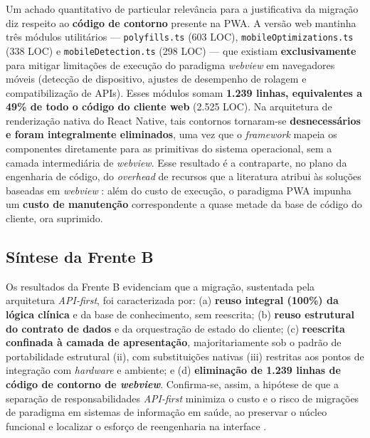 Um achado quantitativo de particular relevância para a justificativa da migração
diz respeito ao \textbf{código de contorno} presente na PWA. A versão web
mantinha três módulos utilitários --- \texttt{polyfills.ts} (603 LOC),
\texttt{mobileOptimizations.ts} (338 LOC) e \texttt{mobileDetection.ts} (298
LOC) --- que existiam \textbf{exclusivamente} para mitigar limitações de
execução do paradigma \emph{webview} em navegadores móveis (detecção de
dispositivo, ajustes de desempenho de rolagem e compatibilização de APIs). Esses
módulos somam \textbf{1.239 linhas, equivalentes a 49\% de todo o código do
cliente web} (2.525 LOC). Na arquitetura de renderização nativa do React Native,
tais contornos tornaram-se \textbf{desnecessários e foram integralmente
eliminados}, uma vez que o \emph{framework} mapeia os componentes diretamente
para as primitivas do sistema operacional, sem a camada intermediária de
\emph{webview}. Esse resultado é a contraparte, no plano da engenharia de código,
do \emph{overhead} de recursos que a literatura atribui às soluções baseadas em
\emph{webview} \cite{oliveira2023}: além do custo de execução, o paradigma PWA
impunha um \textbf{custo de manutenção} correspondente a quase metade da base de
código do cliente, ora suprimido.

\subsection{Síntese da Frente B}

Os resultados da Frente B evidenciam que a migração, sustentada pela arquitetura
\emph{API-first}, foi caracterizada por: (a) \textbf{reuso integral (100\%) da
lógica clínica} e da base de conhecimento, sem reescrita; (b) \textbf{reuso
estrutural do contrato de dados} e da orquestração de estado do cliente; (c)
\textbf{reescrita confinada à camada de apresentação}, majoritariamente sob o
padrão de portabilidade estrutural (ii), com substituições nativas (iii)
restritas aos pontos de integração com \emph{hardware} e ambiente; e (d)
\textbf{eliminação de 1.239 linhas de código de contorno de \emph{webview}}.
Confirma-se, assim, a hipótese de que a separação de responsabilidades
\emph{API-first} minimiza o custo e o risco de migrações de paradigma em
sistemas de informação em saúde, ao preservar o núcleo funcional e localizar o
esforço de reengenharia na interface \cite{rampinelli2026, oliveira2023}.
